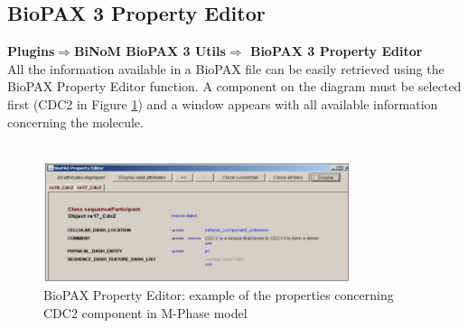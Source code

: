 \subsection{BioPAX 3 Property Editor} \label{BioPAX_Property_Editor}
\textbf{Plugins$\Rightarrow$BiNoM BioPAX 3 Utils$\Rightarrow$ BioPAX 3 Property Editor}\\

All the information available in a BioPAX file can be easily retrieved using the
BioPAX Property Editor function. A component on the diagram must be selected
first (CDC2 in Figure \ref{BioPAX_Property_Editor_cdc2}) and a window appears
with all available information concerning the molecule.\\\\

\begin{figure}[h]
\centering
\includegraphics[width=0.8\textwidth]{graphics/BioPAX_Property_Editor_cdc2}
\caption{BioPAX Property Editor: example of the properties concerning CDC2
component in M-Phase model}
\label{BioPAX_Property_Editor_cdc2}
\end{figure}


